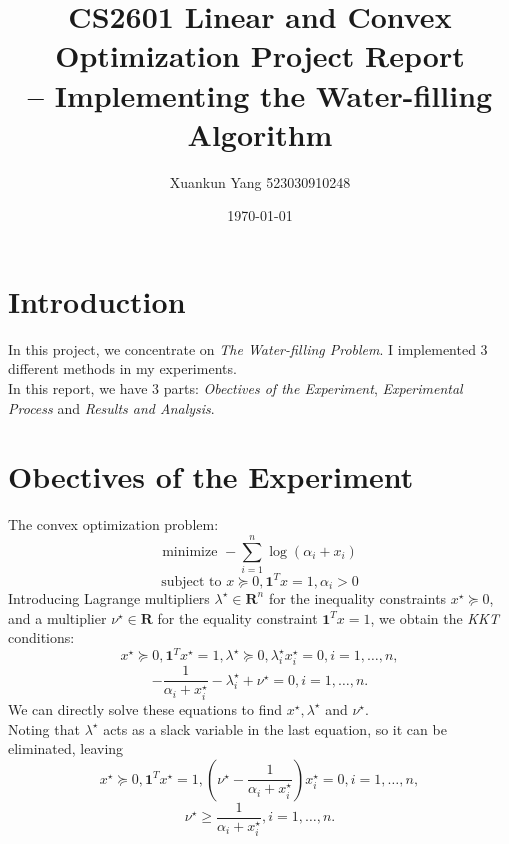 \documentclass[12pt, a4paper, oneside]{article}
\title{\textbf{CS2601} Linear and Convex Optimization Project Report \\-- Implementing the Water-filling Algorithm}
\date{\today}
\author{Xuankun Yang 523030910248}
\begin{document}
\maketitle
\tableofcontents

\section{Introduction}
In this project, we concentrate on \textit{The Water-filling Problem}. I implemented 3 different methods in my experiments.\\
In this report, we have 3 parts: \textit{Obectives of the Experiment}, \textit{Experimental Process} and \textit{Results and Analysis}.

\section{Obectives of the Experiment}
The convex optimization problem:
\begin{displaymath}
    \mbox{minimize } -\sum_{i=1}^{n}\log{(\alpha_i + x_i)}
\end{displaymath}
\begin{displaymath}
    \mbox{subject to } x \succeq 0 , \mathbf{1}^Tx = 1 , \alpha_i > 0
\end{displaymath}
Introducing Lagrange multipliers $\lambda^{\star} \in \mathbf{R}^n$ for the inequality constraints $x^{\star} \succeq 0$, 
and a multiplier $\nu^{\star} \in \mathbf{R}$ for the equality constraint $\mathbf{1}^Tx = 1$, 
we obtain the \textit{KKT} conditions:
\begin{displaymath}
    x^{\star} \succeq 0 ,  \mathbf{1}^Tx^{\star} = 1 , \lambda^{\star} \succeq 0 , \lambda_i^{\star}x_i^{\star} = 0 , i = 1, \dots ,n ,
\end{displaymath}
\begin{displaymath}
    -\frac{1}{\alpha_i + x_i^{\star}} - \lambda_i^{\star} + \nu^{\star} = 0,  i = 1, \dots ,n.
\end{displaymath}
We can directly solve these equations to find $x^{\star}, \lambda^{\star}$ and $\nu^{\star}$.\\
Noting that $\lambda^{\star}$ acts as a slack variable in the last equation, so it can be eliminated, leaving
\begin{displaymath}
    x^{\star} \succeq 0 ,  \mathbf{1}^Tx^{\star} = 1 , (\nu^{\star} - \frac{1}{\alpha_i + x_i^{\star}})x_i^{\star} = 0 , i = 1, \dots , n,
\end{displaymath}
\begin{displaymath}
    \nu^{\star} \geqslant \frac{1}{\alpha_i + x_i^{\star}} , i = 1, \dots ,n.
\end{displaymath}
\end{document}
